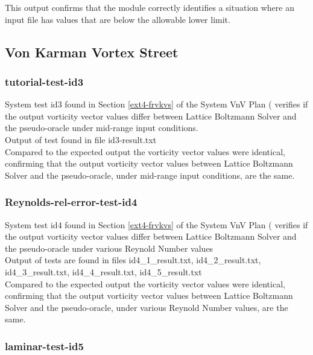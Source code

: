 \documentclass[12pt, titlepage]{article}
\newcommand{\myprogname}{Lattice Boltzmann Solver}
\begin{document}
\noindent This output confirms that the module correctly identifies a situation where an input file has values that are below the allowable lower limit.\\

\subsection{Von Karman Vortex Street}
\subsubsection{tutorial-test-id3}

System test id3 found in Section \ref{ext4-frvkvs} of the System VnV Plan (\citet{LBM_SVNV_PM} verifies if the output vorticity vector values differ between {\myprogname} and the pseudo-oracle under mid-range input conditions.\\

\noindent Output of test found in file id3-result.txt\\

\noindent Compared to the expected output the vorticity vector values were identical, confirming that the output vorticity vector values between {\myprogname} and the pseudo-oracle, under mid-range input conditions, are the same.\\


\subsubsection{Reynolds-rel-error-test-id4}

System test id4 found in Section \ref{ext4-frvkvs} of the System VnV Plan (\citet{LBM_SVNV_PM} verifies if the output vorticity vector values differ between {\myprogname} and the pseudo-oracle under various Reynold Number values\\

\noindent Output of tests are found in files id4\_1\_result.txt, id4\_2\_result.txt, id4\_3\_result.txt, id4\_4\_result.txt, id4\_5\_result.txt\\

\noindent Compared to the expected output the vorticity vector values were identical, confirming that the output vorticity vector values between {\myprogname} and the pseudo-oracle, under various Reynold Number values, are the same.\\


\subsubsection{laminar-test-id5}
\end{document}
